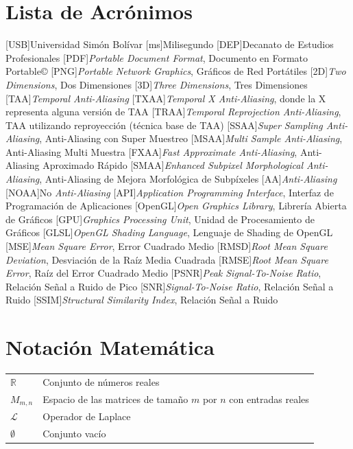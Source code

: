 \documentclass[pregrado]{tesis-usb} %
\begin{document}
\tableofcontents
\listoffigures
\listoftables

\chapter*{Lista de Acrónimos}
\begin{acronym}
	[USB]{Universidad Sim\'on Bol\'ivar}
	[ms]{Milisegundo}
	[DEP]{Decanato de Estudios Profesionales}
	[PDF]{\textit{Portable Document Format}, Documento en Formato Portable\copyright}
	[PNG]{\textit{Portable Network Graphics}, Gráficos de Red Portátiles}
	[2D]{\textit{Two Dimensions}, Dos Dimensiones}
	[3D]{\textit{Three Dimensions}, Tres Dimensiones}
	[TAA]{\textit{Temporal Anti-Aliasing}}
	[TXAA]{\textit{Temporal X Anti-Aliasing}, donde la X representa alguna versión de TAA}
	[TRAA]{\textit{Temporal Reprojection Anti-Aliasing}, TAA utilizando reproyección (técnica base de TAA)}
	[SSAA]{\textit{Super Sampling Anti-Aliasing}, Anti-Aliasing con Super Muestreo}
	[MSAA]{\textit{Multi Sample Anti-Aliasing}, Anti-Aliasing Multi Muestra}
	[FXAA]{\textit{Fast Approximate Anti-Aliasing}, Anti-Aliasing Aproximado Rápido}
	[SMAA]{\textit{Enhanced Subpixel Morphological Anti-Aliasing}, Anti-Aliasing de Mejora Morfológica de Subpíxeles}
	[AA]{\textit{Anti-Aliasing}}
	[NOAA]{No \textit{Anti-Aliasing}}
	[API]{\textit{Application Programming Interface}, Interfaz de Programación de Aplicaciones}
	[OpenGL]{\textit{Open Graphics Library}, Librería Abierta de Gráficos}
	[GPU]{\textit{Graphics Processing Unit}, Unidad de Procesamiento de Gráficos}
	[GLSL]{\textit{OpenGL Shading Language}, Lenguaje de Shading de OpenGL}
	[MSE]{\textit{Mean Square Error}, Error Cuadrado Medio}
	[RMSD]{\textit{Root Mean Square Deviation}, Desviación de la Raíz Media Cuadrada}
	[RMSE]{\textit{Root Mean Square Error}, Raíz del Error Cuadrado Medio}
	[PSNR]{\textit{Peak Signal-To-Noise Ratio}, Relación Señal a Ruido de Pico}
	[SNR]{\textit{Signal-To-Noise Ratio}, Relación Señal a Ruido}
	[SSIM]{\textit{Structural Similarity Index}, Relación Señal a Ruido}

\end{acronym}
\clearpage

\chapter*{Notación Matemática}
\begin{tabular}{ll}
	$\mathbb{R}$ & Conjunto de n\'umeros reales\\
	$M_{m,n}$ & Espacio de las matrices de tama\~no $m$ por $n$ con entradas reales\\
	$\mathcal{L}$ & Operador de Laplace\\
	$\emptyset$ & Conjunto vac\'io
\end{tabular}
\end{document}
